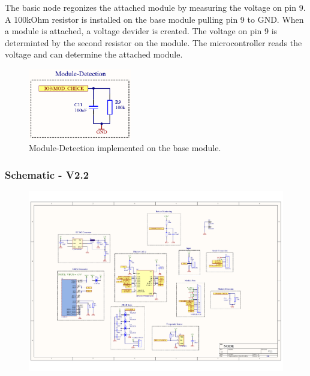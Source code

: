         The basic node regonizes the attached module by measuring the voltage on pin 9.
        A 100kOhm resistor is installed on the base module pulling pin 9 to GND. 
        When a module is attached, a voltage devider is created. The voltage on pin 9 is 
        determinted by the second resistor on the module. The microcontroller reads the
        voltage and can determine the attached module. 
    
    \begin{figure}[H]
        \centering
        \includegraphics[width=0.4\textwidth]{assets/HW/Node-Module-Check.png}
        \caption{Module-Detection implemented on the base module.}
    \end{figure}
    
    
    
    \subsubsection{Schematic - V2.2}
      
        
    \begin{figure}[H]
        \centering
        \includegraphics[scale=0.70,page=1, angle=270]{assets/HW/PDF-Schematic/Node-V2.2.pdf}
        
    \end{figure}
    

